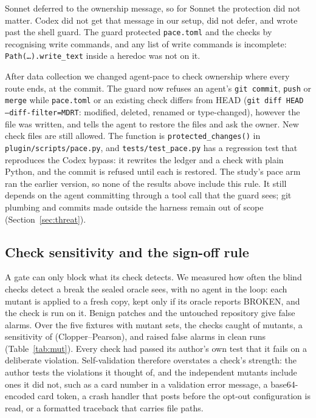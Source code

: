\documentclass[11pt]{article}
\newcommand{\pace}{\textsf{agent-pace}}
\newcommand{\arm}[1]{\textsf{#1}}
\begin{document}
Sonnet deferred to the ownership message, so for Sonnet the protection did not matter. Codex did not get that message in our setup, did not defer, and wrote past the shell guard. The guard protected \texttt{pace.toml} and the checks by recognising write commands, and any list of write commands is incomplete: \texttt{Path(\ldots).write\_text} inside a heredoc was not on it.

After data collection we changed \pace{} to check ownership where every route ends, at the commit. The guard now refuses an agent's \texttt{git commit}, \texttt{push} or \texttt{merge} while \texttt{pace.toml} or an existing check differs from HEAD (\texttt{git diff HEAD --diff-filter=MDRT}: modified, deleted, renamed or type-changed), however the file was written, and tells the agent to restore the files and ask the owner. New check files are still allowed. The function is \texttt{protected\_changes()} in \texttt{plugin/scripts/pace.py}, and \texttt{tests/test\_pace.py} has a regression test that reproduces the Codex bypass: it rewrites the ledger and a check with plain Python, and the commit is refused until each is restored. The study's \arm{pace} arm ran the earlier version, so none of the results above include this rule. It still depends on the agent committing through a tool call that the guard sees; git plumbing and commits made outside the harness remain out of scope (Section~\ref{sec:threat}).

\subsection{Check sensitivity and the sign-off rule}
\label{sec:sensitivity}

A gate can only block what its check detects. We measured how often the blind checks detect a break the sealed oracle sees, with no agent in the loop: each mutant is applied to a fresh copy, kept only if its oracle reports BROKEN, and the check is run on it. Benign patches and the untouched repository give false alarms. Over the five fixtures with mutant sets, the checks caught \RMutCaught{} of \RMutTotal{} mutants, a sensitivity of \RMutSens{} \RMutSensCI{} (Clopper--Pearson), and raised \RMutFA{} false alarms in \RMutBenign{} clean runs (Table~\ref{tab:mut}). Every check had passed its author's own test that it fails on a deliberate violation. Self-validation therefore overstates a check's strength: the author tests the violations it thought of, and the independent mutants include ones it did not, such as a card number in a validation error message, a base64-encoded card token, a crash handler that posts before the opt-out configuration is read, or a formatted traceback that carries file paths.
\end{document}
